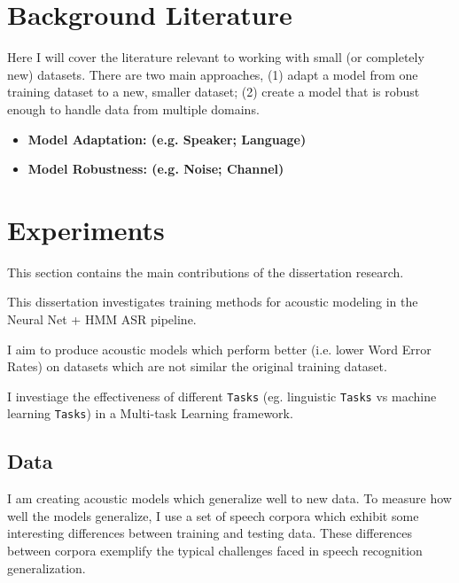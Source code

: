 \documentclass[10pt,a4paper]{article}
\begin{document}
\section{Background Literature}

Here I will cover the literature relevant to working with small (or completely new) datasets. There are two main approaches, (1) adapt a model from one training dataset to a new, smaller dataset; (2) create a model that is robust enough to handle data from multiple domains. 

\begin{itemize}

\item \textbf{Model Adaptation: (e.g. Speaker; Language)}

    
  
\item \textbf{Model Robustness: (e.g. Noise; Channel)}

  
\end{itemize}




\section{Experiments}

This section contains the main contributions of the dissertation research.

This dissertation investigates training methods for acoustic modeling in the Neural Net + HMM ASR pipeline.

I aim to produce acoustic models which perform better (i.e. lower Word Error Rates) on datasets which are not similar the original training dataset.

I investiage the effectiveness of different \texttt{Tasks} (eg. linguistic \texttt{Tasks} vs machine learning \texttt{Tasks}) in a Multi-task Learning framework.


\subsection{Data}

I am creating acoustic models which generalize well to new data. To measure how well the models generalize, I use a set of speech corpora which exhibit some interesting differences between training and testing data. These differences between corpora exemplify the typical challenges faced in speech recognition generalization.
\end{document}
